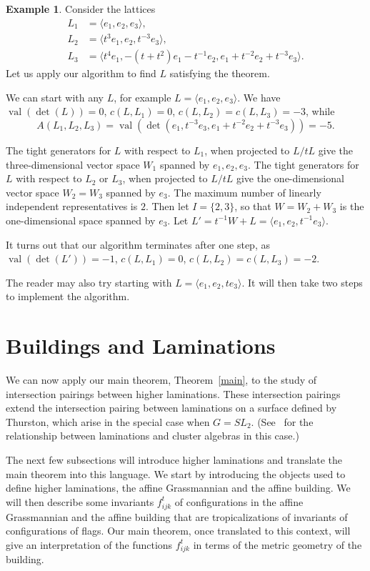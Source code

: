 \documentclass[10pt]{amsart}
\theoremstyle{definition}
\newtheorem{example}[theorem]{Example}
\newcommand{\val}{\operatorname{val}}
\begin{document}
\begin{example} Consider the lattices 
\begin{align*}
L_1&=\langle e_1, e_2, e_3\rangle ,
\\
L_2&=\langle t^3e_1, e_2, t^{-3}e_3\rangle ,
\\
L_3&=\langle t^4e_1, -(t+t^2)e_1-t^{-1}e_2, e_1+ t^{-2}e_2+t^{-3}e_3\rangle .
\end{align*}
Let us apply our algorithm to find $L$ satisfying the theorem.

We can start with any $L$, for example $L=\langle e_1, e_2, e_3\rangle .$ We have $\val(\det(L))=0$, $c(L,L_1)=0$, $c(L,L_2)=c(L,L_3)=-3$, while 
\[
A(L_1, L_2, L_3)=\val(\det(e_1, t^{-3}e_3, e_1+ t^{-2}e_2+t^{-3}e_3)) = -5.
\]

The tight generators for $L$ with respect to $L_1$, when projected to $L/tL$ give the three-dimensional vector space $W_1$ spanned by $e_1, e_2, e_3$. The tight generators for $L$ with respect to $L_2$ or $L_3$, when projected to $L/tL$ give the one-dimensional vector space $W_2=W_3$ spanned by $e_3$. The maximum number of linearly independent representatives is $2$. Then let $I = \{2, 3\}$, so that $W=W_2+W_3$ is the one-dimensional space spanned by $e_3$. Let $L'=t^{-1}W+L=\langle e_1, e_2, t^{-1}e_3\rangle .$

It turns out that our algorithm terminates after one step, as $\val(\det(L'))=-1$, $c(L,L_1)=0$, $c(L,L_2)=c(L,L_3)=-2$.

The reader may also try starting with $L=\langle e_1, e_2, te_3\rangle $. It will then take two steps to implement the algorithm.

\end{example}

\section{Buildings and Laminations}\label{sect5}

We can now apply our main theorem, Theorem~\ref{main}, to the study of intersection pairings between higher laminations. These intersection pairings extend the intersection pairing between laminations on a surface defined by Thurston, which arise in the special case when $G=SL_2$. (See~\cite{FST} for the relationship between laminations and cluster algebras in this case.)

The next few subsections will introduce higher laminations and translate the main theorem into this language. We start by introducing the objects used to define higher laminations, the affine Grassmannian and the affine building. We will then describe some invariants $f_{ijk}^t$ of configurations in the affine Grassmannian and the affine building that are tropicalizations of invariants of configurations of flags. Our main theorem, once translated to this context, will give an interpretation of the functions $f_{ijk}^t$ in terms of the metric geometry of the building.
\end{document}
